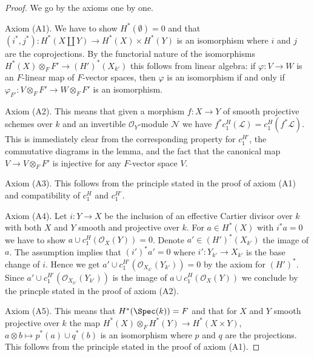 \begin{proof}

We go by the axioms one by one.

\medskip\noindent
Axiom (A1). We have to show $H^*(\emptyset) = 0$ and that
$(i^*, j^*) : H^*(X \amalg Y) \to H^*(X) \times H^*(Y)$
is an isomorphism where $i$ and $j$ are the coprojections.
By the functorial nature of the isomorphisms
$H^*(X) \otimes_F F' \to (H')^*(X_{k'})$ this
follows from linear algebra: if $\varphi : V \to W$ is an $F$-linear map
of $F$-vector spaces, then $\varphi$ is an isomorphism if and only if
$\varphi_{F'} : V \otimes_F F' \to W \otimes_F F'$ is an isomorphism.

\medskip\noindent
Axiom (A2). This means that given a morphism $f : X \to Y$ of smooth projective
schemes over $k$ and an invertible $\mathcal{O}_Y$-module $\mathcal{N}$
we have $f^*c_1^H(\mathcal{L}) = c_1^H(f^*\mathcal{L})$. This is immediately
clear from the corresponding property for $c_1^{H'}$, the commutative
diagrams in the lemma, and the fact that the canonical map
$V \to V \otimes_F F'$ is injective for any $F$-vector space $V$.

\medskip\noindent
Axiom (A3). This follows from the principle stated in the proof of
axiom (A1) and compatibility of $c_1^H$ and $c_1^{H'}$.

\medskip\noindent
Axiom (A4). Let $i : Y \to X$ be the inclusion of an effective
Cartier divisor over $k$ with both $X$ and $Y$ smooth and projective
over $k$. For $a \in H^*(X)$ with
$i^*a = 0$ we have to show $a \cup c_1^H(\mathcal{O}_X(Y)) = 0$.
Denote $a' \in (H')^*(X_{k'})$ the image of $a$.
The assumption implies that $(i')^*a' = 0$ where $i' : Y_{k'} \to X_{k'}$
is the base change of $i$. Hence we get
$a' \cup c_1^{H'}(\mathcal{O}_{X_{k'}}(Y_{k'})) = 0$ by the axiom
for $(H')^*$. Since $a' \cup c_1^{H'}(\mathcal{O}_{X_{k'}}(Y_{k'}))$
is the image of $a \cup c_1^H(\mathcal{O}_X(Y))$ we conclude by
the princple stated in the proof of axiom (A2).

\medskip\noindent
Axiom (A5). This means that $H^*(\Spec(k)) = F$ and that for $X$ and $Y$ smooth
projective over $k$ the map $H^*(X) \otimes_F H^*(Y) \to H^*(X \times Y)$,
$a \otimes b \mapsto p^*(a) \cup q^*(b)$ is an isomorphism
where $p$ and $q$ are the projections. This follows from the principle
stated in the proof of axiom (A1).


\end{proof}
